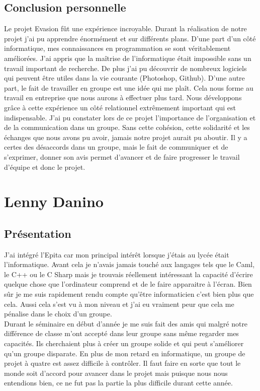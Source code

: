 \documentclass[12pt]{article}
\begin{document}
\subsection{Conclusion personnelle}
Le projet Evasion fût une expérience incroyable. Durant la réalisation de notre projet j'ai pu apprendre énormément et sur différents plans. D'une part d'un côté informatique, mes connaissances en programmation se sont véritablement améliorées. J'ai appris que la maîtrise de l'informatique était impossible sans un travail important de recherche. De plus j'ai pu découvrir de nombreux logiciels qui peuvent être utiles dans la vie courante (Photoshop, Github). D'une autre part, le fait de travailler en groupe est une idée qui me plaît. Cela nous forme au travail en entreprise que nous aurons à effectuer plus tard. Nous développons grâce à cette expérience un côté relationnel extrêmement important qui est indispensable. J'ai pu constater lors de ce projet l'importance de l'organisation et de la communication dans un groupe. Sans cette cohésion, cette solidarité et les échanges que nous avons pu avoir, jamais notre projet aurait pu aboutir. Il y a certes des désaccords dans un groupe, mais le fait de communiquer et de s'exprimer, donner son avis permet d'avancer et de faire progresser le travail d'équipe et donc le projet.
\newpage

\section{Lenny Danino}

\subsection{Présentation}

J’ai intégré l’Epita car mon principal intérêt lorsque j’étais au lycée était l’informatique. Avant cela je n’avais jamais touché aux langages tels que le Caml, le C++ ou le C Sharp mais je trouvais réellement intéressant la capacité d’écrire quelque chose que l’ordinateur comprend et de le faire apparaitre à l’écran. Bien sûr je me suis rapidement rendu compte qu’être informaticien c’est bien plus que cela. Aussi cela s’est vu à mon niveau et j’ai eu vraiment peur que cela me pénalise dans le choix d’un groupe.\\

Durant le séminaire en début d’année je me suis fait des amis qui malgré notre différence de classe m’ont accepté dans leur groupe sans même regarder mes capacités. Ils cherchaient plus à créer un groupe solide et qui peut s’améliorer qu’un groupe disparate. En plus de mon retard en informatique, un groupe de projet à quatre est assez difficile à contrôler. Il faut faire en sorte que tout le monde soit d’accord pour avancer dans le projet mais puisque nous nous entendions bien, ce ne fut pas la partie la plus difficile durant cette année.\\
\end{document}
